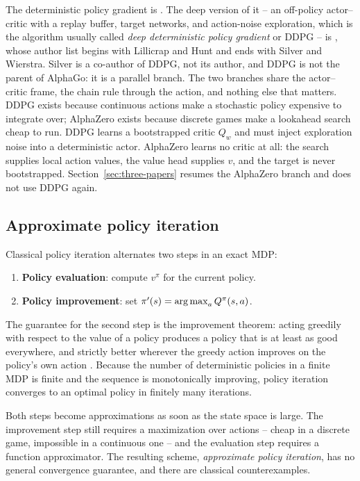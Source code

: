 \begin{remark}
The deterministic policy gradient is \citet{silver2014dpg}. The deep version of
it -- an off-policy actor--critic with a replay buffer, target networks, and
action-noise exploration, which is the algorithm usually called \emph{deep
deterministic policy gradient} or DDPG -- is \citet{lillicrap2015ddpg}, whose
author list begins with Lillicrap and Hunt and ends with Silver and Wierstra.
Silver is a co-author of DDPG, not its author, and DDPG is not the parent of
AlphaGo: it is a parallel branch. The two branches share the actor--critic
frame, the chain rule through the action, and nothing else that matters. DDPG
exists because continuous actions make a stochastic policy expensive to
integrate over; AlphaZero exists because discrete games make a lookahead search
cheap to run. DDPG learns a bootstrapped critic $Q_w$ and must inject
exploration noise into a deterministic actor. AlphaZero learns no critic at all:
the search supplies local action values, the value head supplies $v$, and the
target is never bootstrapped. Section~\ref{sec:three-papers} resumes the
AlphaZero branch and does not use DDPG again.
\end{remark}

\subsection{Approximate policy iteration}
\label{sec:apxpi}

Classical policy iteration alternates two steps in an exact MDP:

\begin{enumerate}
  \item \textbf{Policy evaluation}: compute $v^{\pi}$ for the current policy.
  \item \textbf{Policy improvement}: set $\pi'(s) = \operatorname*{arg\,max}_a Q^{\pi}(s,a)$.
\end{enumerate}

The guarantee for the second step is the improvement theorem: acting greedily
with respect to the value of a policy produces a policy that is at least as
good everywhere, and strictly better wherever the greedy action improves on the
policy's own action \citep{suttonbarto2018}. Because the number of deterministic
policies in a finite MDP is finite and the sequence is monotonically improving,
policy iteration converges to an optimal policy in finitely many iterations.

Both steps become approximations as soon as the state space is large. The
improvement step still requires a maximization over actions -- cheap in a
discrete game, impossible in a continuous one -- and the evaluation step
requires a function approximator. The resulting scheme, \emph{approximate policy
iteration}, has no general convergence guarantee, and there are classical
counterexamples.

